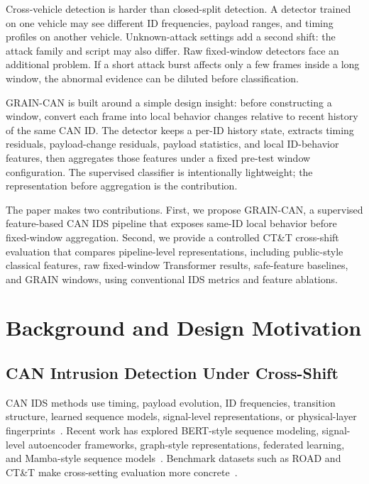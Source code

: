\documentclass[runningheads]{llncs}
\newcommand{\method}{GRAIN-CAN}
\begin{document}
Cross-vehicle detection is harder than closed-split detection. A detector trained on one vehicle may see different ID frequencies, payload ranges, and timing profiles on another vehicle. Unknown-attack settings add a second shift: the attack family and script may also differ. Raw fixed-window detectors face an additional problem. If a short attack burst affects only a few frames inside a long window, the abnormal evidence can be diluted before classification.

\method{} is built around a simple design insight: before constructing a window, convert each frame into local behavior changes relative to recent history of the same CAN ID. The detector keeps a per-ID history state, extracts timing residuals, payload-change residuals, payload statistics, and local ID-behavior features, then aggregates those features under a fixed pre-test window configuration. The supervised classifier is intentionally lightweight; the representation before aggregation is the contribution.

The paper makes two contributions. First, we propose \method{}, a supervised feature-based CAN IDS pipeline that exposes same-ID local behavior before fixed-window aggregation. Second, we provide a controlled CT\&T cross-shift evaluation that compares pipeline-level representations, including public-style classical features, raw fixed-window Transformer results, safe-feature baselines, and GRAIN windows, using conventional IDS metrics and feature ablations.

\section{Background and Design Motivation}
\subsection{CAN Intrusion Detection Under Cross-Shift}
CAN IDS methods use timing, payload evolution, ID frequencies, transition structure, learned sequence models, signal-level representations, or physical-layer fingerprints~\cite{song2016intrusion,taylor2016frequency,cho2016fingerprinting,cho2017viden}. Recent work has explored BERT-style sequence modeling, signal-level autoencoder frameworks, graph-style representations, federated learning, and Mamba-style sequence models~\cite{alkhatib2022canbert,shahriar2022canshield,wang2023statgraph,althunayyan2024federated,liu2026mids}. Benchmark datasets such as ROAD and CT\&T make cross-setting evaluation more concrete~\cite{verma2020road,blevins2021time,lampe2024ctt,guerra2024road}.
\end{document}
